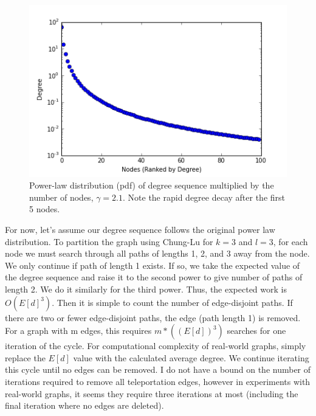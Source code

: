 \documentclass{article}
\begin{document}
\begin{figure}[H]
\begin{center}
\includegraphics[width=\linewidth]{powerlawdeg.png}
  \caption{Power-law distribution (pdf) of degree sequence multiplied by the number of nodes, $\gamma = 2.1$. Note the rapid degree decay after the first 5 nodes.}
  \end{center}
  \end{figure}

For now, let's assume our degree sequence follows the original power law distribution. To partition the graph using Chung-Lu for $k = 3$ and $l = 3$, for each node we must search through all paths of lengths 1, 2, and 3 away from the node. We only continue if path of length 1 exists. If so, we take the expected value of the degree sequence and raise it to the second power to give number of paths of length 2. We do it similarly for the third power. Thus, the expected work is $O(E[d]^3)$. Then it is simple to count the number of edge-disjoint paths. If there are two or fewer edge-disjoint paths, the edge (path length 1) is removed. For a graph with m edges, this requires $m*((E[d])^{3})$ searches for one iteration of the cycle. For computational complexity of real-world graphs, simply replace the $E[d]$ value with the calculated average degree. We continue iterating this cycle until no edges can be removed. I do not have a bound on the number of iterations required to remove all teleportation edges, however in experiments with real-world graphs, it seems they require three iterations at most (including the final iteration where no edges are deleted).
\end{document}
